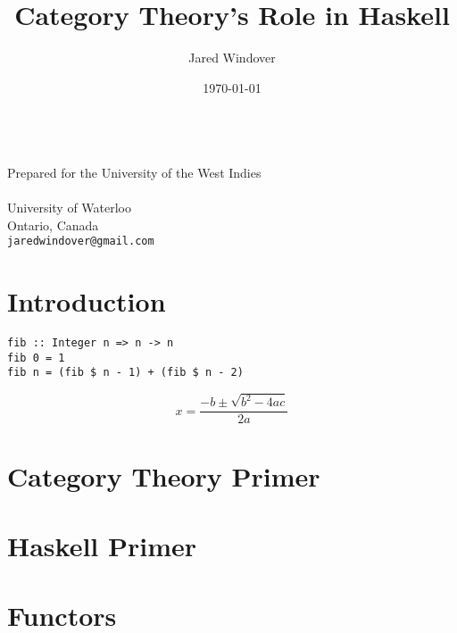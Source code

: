 \documentclass{article}
\title{Category Theory's Role in Haskell}
\author{Jared Windover}
\date{\today}
\begin{document}

\makeatletter
\begin{titlepage}
\begin{center}
{\Huge \@title}\\
{\Large Prepared for the University of the West Indies}\\[1em]
{\LARGE \@author}\\
{\large University of Waterloo\\
Ontario, Canada\\
\texttt{jaredwindover@gmail.com}}\\[0.8em]
{\Large \@date}
\end{center}
\begin{abstract}
\lipsum[1-2]
\end{abstract}
\end{titlepage}
\makeatother

\setcounter{page}{2}

\tableofcontents
\newpage


\section{Introduction}

\begin{algex}[My algorithm]
\begin{lstlisting}[style=Hask,caption={This is an algorithm for calculating the fibonacci numbers ~\parencite{Nobody06}.}]
fib :: Integer n => n -> n
fib 0 = 1
fib n = (fib $ n - 1) + (fib $ n - 2)
\end{lstlisting}
\end{algex} 

\begin{ex}
\begin{equation}
x = \frac{-b \pm \sqrt{b^2 - 4ac}}{2a}
\end{equation}
\end{ex}
\section{Category Theory Primer}
\section{Haskell Primer}
\section{Functors}
\end{document}
